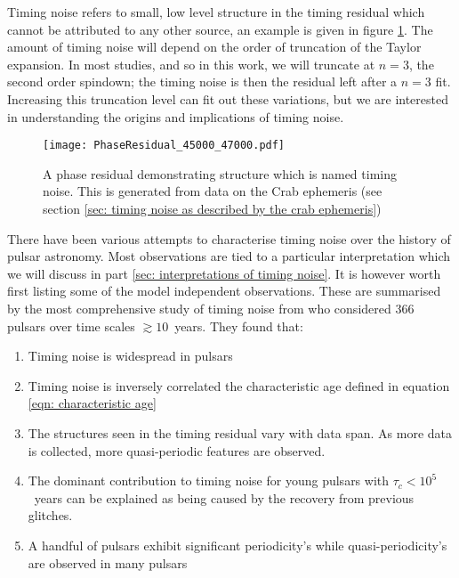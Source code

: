 Timing noise refers to small, low level structure in the timing residual which
cannot be attributed to any other source, an example is given in figure
\ref{fig: timing noise example}. The amount of timing noise will depend on the
order of truncation of the Taylor expansion.  In most studies, and so in this
work, we will truncate at $n=3$, the second order spindown; the timing noise is
then the residual left after a $n=3$ fit. Increasing this truncation level can
fit out these variations, but we are interested in understanding the origins
and implications of timing noise.

\begin{figure}[htb] 
    \centering
    \texttt{[image: PhaseResidual\_45000\_47000.pdf]}
    \caption{A phase residual demonstrating structure which is named timing
        noise.  This is generated from data on the Crab ephemeris (see section
    \ref{sec: timing noise as described by the crab ephemeris})}
    \label{fig: timing noise example}
\end{figure} 

There have been various attempts to characterise timing noise
over the history of 
pulsar astronomy. Most observations are tied to a particular interpretation
which we will discuss in part \ref{sec: interpretations of timing noise}.
It is however worth first listing some of the model independent observations.
These are summarised by the most comprehensive study of timing noise from 
\citet{Hobbs2010} who considered 366 pulsars over time scales $\gtrsim10$~years.
They found that:
\begin{enumerate}

    \item Timing noise is widespread in pulsars

    \item Timing noise is inversely correlated the characteristic age
        defined in equation \ref{eqn: characteristic age}

    \item The structures seen in the timing residual vary with data span. As
        more data is collected, more quasi-periodic features are observed.

    \item The dominant contribution to timing noise for young pulsars with
        $\tau_{c}<10^{5}$~years can be explained as being caused by the
        recovery from previous glitches.

    \item A handful of pulsars exhibit significant periodicity's while
        quasi-periodicity's are observed in many pulsars

\end{enumerate}


